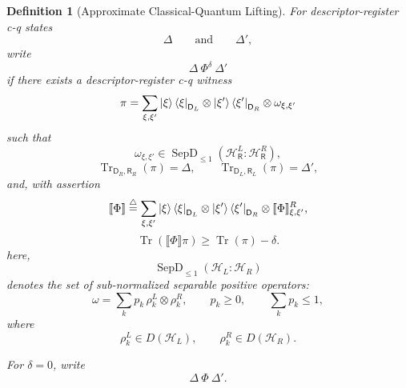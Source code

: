 \documentclass[acmsmall,screen,review,anonymous,nonacm]{acmart}
\newtheorem{definition}{Definition}[section]
\theoremstyle{defn_style}
\begin{document}
\begin{definition}[Approximate Classical-Quantum Lifting]
      For descriptor-register c-q states
      \[
      \Delta
      \qquad
      \text{and}
      \qquad
      \Delta',
      \]
      write
      \[
      \Delta\ \Phi^\delta\ \Delta'
      \]
      if there exists a descriptor-register c-q witness
      \[
      \pi
      =
      \sum_{\xi,\xi'}
      \ket{\xi}\bra{\xi}_{\mathsf D_L}
      \otimes
      \ket{\xi'}\bra{\xi'}_{\mathsf D_R}
      \otimes
      \omega_{\xi,\xi'}
      \]
      such that
      \[
      \omega_{\xi,\xi'}
      \in
      \operatorname{SepD}_{\le 1}(\mathcal H^L_{\mathsf R}:\mathcal H^R_{\mathsf R}),
      \]
      \[
      \operatorname{Tr}_{\mathsf D_R,\mathsf R_R}(\pi)
      =
      \Delta,
      \qquad
      \operatorname{Tr}_{\mathsf D_L,\mathsf R_L}(\pi)
      =
      \Delta',
      \]
      and, with assertion
      \[\llbracket\Phi\rrbracket
      \stackrel{\triangle}{=}
      \sum_{\xi,\xi'}
      \ket{\xi}\bra{\xi}_{\mathsf D_L}
      \otimes
      \ket{\xi'}\bra{\xi'}_{\mathsf D_R}
      \otimes
      \llbracket\Phi\rrbracket^R_{\xi,\xi'},
      \]
      \[
      \operatorname{Tr}
      \left(
      \llbracket\Phi\rrbracket
      \pi
      \right)
      \ge
      \operatorname{Tr}(\pi)-\delta.
      \]
    here,
    \[
      \operatorname{SepD}_{\le 1}(\mathcal H_L:\mathcal H_R)
      \]
      denotes the set of sub-normalized separable positive operators:
      \[
      \omega
      =
      \sum_k p_k\,
      \rho^L_k\otimes\rho^R_k,
      \qquad
      p_k\ge 0,
      \qquad
      \sum_k p_k\le 1,
      \]
      where
      \[
      \rho^L_k\in D(\mathcal H_L),
      \qquad
      \rho^R_k\in D(\mathcal H_R).
      \]

      
      For \(\delta=0\), write
      \[
      \Delta\ \Phi\ \Delta' .
      \]
      \end{definition}
\end{document}
